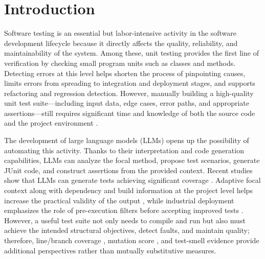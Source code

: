 \documentclass[pdflatex,sn-basic,Numbered,iicol]{sn-jnl}
\begin{document}

\maketitle
\clearpage

\section{Introduction}\label{sec:introduction}

Software testing is an essential but labor-intensive activity in the software development lifecycle because it directly affects the quality, reliability, and maintainability of the system. Among these, unit testing provides the first line of verification by checking small program units such as classes and methods. Detecting errors at this level helps shorten the process of pinpointing causes, limits errors from spreading to integration and deployment stages, and supports refactoring and regression detection. However, manually building a high-quality unit test suite---including input data, edge cases, error paths, and appropriate assertions---still requires significant time and knowledge of both the source code and the project environment \cite{bib26,bib4,bib5}.

The development of large language models (LLMs) opens up the possibility of automating this activity. Thanks to their interpretation and code generation capabilities, LLMs can analyze the focal method, propose test scenarios, generate JUnit code, and construct assertions from the provided context. Recent studies show that LLMs can generate tests achieving significant coverage \cite{bib26,bib4,bib5,bib6}. Adaptive focal context along with dependency and build information at the project level helps increase the practical validity of the output \cite{bib4,bib5,bib29}, while industrial deployment emphasizes the role of pre-execution filters before accepting improved tests \cite{bib32}. However, a useful test suite not only needs to compile and run but also must achieve the intended structural objectives, detect faults, and maintain quality; therefore, line/branch coverage \cite{bib33}, mutation score \cite{bib34}, and test-smell evidence \cite{bib25} provide additional perspectives rather than mutually substitutive measures.
\end{document}

